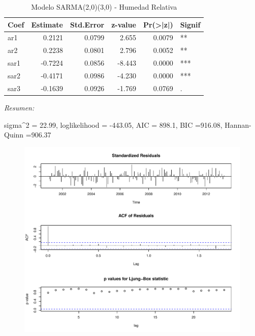 \documentclass[12pt,oneside]{book}\usepackage[]{graphicx}\usepackage[]{color}
\makeatletter
\def\maxwidth{ %
  \ifdim\Gin@nat@width>\linewidth
    \linewidth
  \else
    \Gin@nat@width
  \fi
}
\newenvironment{knitrout}{}{} %
\theoremstyle{definition} %
\makeatother
\begin{document}
\begin{enumerate}
\begin{knitrout}
\color{fgcolor}\begin{table}

\caption{\label{tab:model_x4}\label{tab:sarma_humed}Modelo SARMA(2,0)(3,0) - Humedad Relativa}
\centering
\begin{threeparttable}
\begin{tabular}[t]{lrrrrl}
\toprule
Coef & Estimate & Std.Error & z-value & Pr(>|z|) & Signif\\
\midrule
\rowcolor{gray!6}  ar1 & 0.2121 & 0.0799 & 2.655 & 0.0079 & **\\
ar2 & 0.2238 & 0.0801 & 2.796 & 0.0052 & **\\
\rowcolor{gray!6}  sar1 & -0.7224 & 0.0856 & -8.443 & 0.0000 & ***\\
sar2 & -0.4171 & 0.0986 & -4.230 & 0.0000 & ***\\
\rowcolor{gray!6}  sar3 & -0.1639 & 0.0926 & -1.769 & 0.0769 & .\\
\bottomrule
\end{tabular}
\begin{tablenotes}
\item \textit{Resumen:} 
\item sigma\textasciicircum{}2 = 22.99, loglikelihood = -443.05, AIC = 898.1, BIC =916.08, Hannan-Quinn =906.37
\end{tablenotes}
\end{threeparttable}
\end{table}


\end{knitrout}


\begin{knitrout}
\color{fgcolor}\begin{figure}[H]

{\centering \includegraphics[width=\maxwidth]{figure/unnamed-chunk-39-1} 

}
\end{figure}
\end{knitrout}
\end{enumerate}
\end{document}
